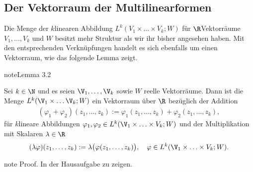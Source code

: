 \documentclass[letterpaper,10pt,german]{jupyterBook}
\begin{document}
\subsection{Der Vektorraum der Multilinearformen}
\label{\detokenize{vektoranalysis/multilinear:der-vektorraum-der-multilinearformen}}
\sphinxAtStartPar
Die Menge der \(k\)\sphinxhyphen{}linearen Abbildung \(L^k(V_1 \times \ldots \times V_k; W)\) für \(\R\)\sphinxhyphen{}Vektorräume \(V_1,\ldots,V_k\) und \(W\) besitzt mehr Struktur als wir ihr bisher angesehen haben.
Mit den entsprechenden Verknüpfungen handelt es sich ebenfalls um einen Vektorraum, wie das folgende Lemma zeigt.
\label{vektoranalysis/multilinear:lemma-9}
\begin{sphinxadmonition}{note}{Lemma 3.2}



\sphinxAtStartPar
Sei \(k \in \N\) und es seien \(\V_1,\ldots,\V_k\) sowie \(W\) reelle Vektorräume.
Dann ist die Menge \(L^k(\V_1\times\ldots\V_k; W)\) ein Vektorraum über \(\R\) bezüglich der Addition
\begin{equation*}
\begin{split}(\varphi_1+\varphi_2)(z_1,\ldots,z_k) := \varphi_1(z_1,\ldots,z_k) +
\varphi_2(z_1,\ldots,z_k),\end{split}
\end{equation*}
\sphinxAtStartPar
für \(k\)\sphinxhyphen{}lineare Abbildungen \(\varphi_1,\varphi_2\in L^k(\V_1 \times \ldots \times V_k;W)\) und der Multiplikation mit Skalaren \(\lambda \in \R\)
\begin{equation*}
\begin{split}(\lambda\varphi)(z_1,\ldots,z_k) := \lambda\big(\varphi(z_1,\ldots,z_k)\big),\quad\varphi\in L^k(\V_1 \times \ldots \times V_k;W).\end{split}
\end{equation*}\end{sphinxadmonition}

\begin{sphinxadmonition}{note}
\sphinxAtStartPar
Proof. In der Hausaufgabe zu zeigen.
\end{sphinxadmonition}
\end{document}
